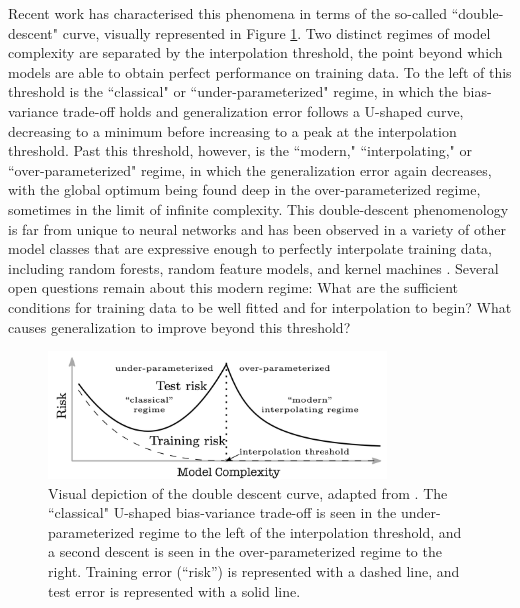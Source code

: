 \documentclass[11pt]{article}
\begin{document}
Recent work \cite{belkinReconcilingModernMachine2019} has characterised this phenomena in terms of the so-called ``double-descent" curve, visually represented in Figure \ref{doubledescent}. Two distinct regimes of model complexity are separated by the interpolation threshold, the point beyond which models are able to obtain perfect performance on training data. To the left of this threshold is the ``classical" or ``under-parameterized" regime, in which the bias-variance trade-off holds and generalization error follows a U-shaped curve, decreasing to a minimum before increasing to a peak at the interpolation threshold. Past this threshold, however, is the ``modern," ``interpolating," or ``over-parameterized" regime, in which the generalization error again decreases, with the global optimum being found deep in the over-parameterized regime, sometimes in the limit of infinite complexity. This double-descent phenomenology is far from unique to neural networks and has been observed in a variety of other model classes that are expressive enough to perfectly interpolate training data, including random forests, random feature models, and kernel machines \cite{ belkinReconcilingModernMachine2019, belkinUnderstandDeepLearning2018}. Several open questions remain about this modern regime: What are the sufficient conditions for training data to be well fitted and for interpolation to begin? What causes generalization to improve beyond this threshold?

\begin{figure}[ht]
\centering
\captionsetup{width=.8\linewidth}
\includegraphics[width=0.8\textwidth]{docs/assets/double_descent_reconciling.png}
\caption{Visual depiction of the double descent curve, adapted from \cite{belkinReconcilingModernMachine2019}. The ``classical" U-shaped bias-variance trade-off is seen in the under-parameterized regime to the left of the interpolation threshold, and a second descent is seen in the over-parameterized regime to the right. Training error (``risk'') is represented with a dashed line, and test error is represented with a solid line.}
\label{doubledescent}
\end{figure}
\end{document}
